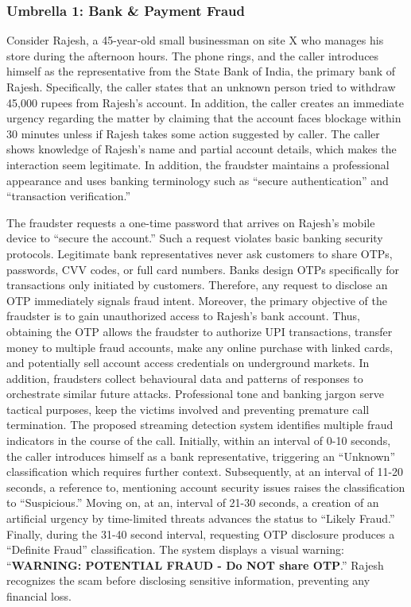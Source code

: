 \documentclass{article}
\begin{document}
\subsubsection{Umbrella 1: Bank \& Payment Fraud}
\label{app:casestudy:bank}

Consider Rajesh, a 45-year-old small businessman on site X who manages his store during the afternoon hours. The phone rings, and the caller introduces himself as the representative from the State Bank of India, the primary bank of Rajesh. Specifically, the caller states that an unknown person tried to withdraw 45,000 rupees from Rajesh's account. In addition, the caller creates an immediate urgency regarding the matter by claiming that the account faces blockage within 30 minutes unless if Rajesh takes some action suggested by caller. The caller shows knowledge of Rajesh's name and partial account details, which makes the interaction seem legitimate. In addition, the fraudster maintains a professional appearance and uses banking terminology such as ``secure authentication'' and ``transaction verification.''

The fraudster requests a one-time password that arrives on Rajesh's mobile device to ``secure the account.'' Such a request violates basic banking security protocols. Legitimate bank representatives never ask customers to share OTPs, passwords, CVV codes, or full card numbers. Banks design OTPs specifically for transactions only initiated by customers. Therefore, any request to disclose an OTP immediately signals fraud intent. Moreover, the primary objective of the fraudster is to gain unauthorized access to Rajesh's bank account. Thus, obtaining the OTP allows the fraudster to authorize UPI transactions, transfer money to multiple fraud accounts, make any online purchase with linked cards, and potentially sell account access credentials on underground markets. In addition, fraudsters collect behavioural data and patterns of responses to orchestrate similar future attacks. Professional tone and banking jargon serve tactical purposes, keep the victims involved and preventing premature call termination. The proposed streaming detection system identifies multiple fraud indicators in the course of the call. Initially, within an interval of 0-10 seconds, the caller introduces himself as a bank representative, triggering an ``Unknown'' classification which requires further context. Subsequently, at an interval of 11-20 seconds, a reference to, mentioning account security issues raises the classification to ``Suspicious.'' Moving on, at an, interval of 21-30 seconds, a creation of an artificial urgency by time-limited threats advances the status to ``Likely Fraud.'' Finally, during the 31-40 second interval, requesting OTP disclosure produces a ``Definite Fraud'' classification. The system displays a visual warning: ``\textbf{WARNING: POTENTIAL FRAUD - Do NOT share OTP}.'' Rajesh recognizes the scam before disclosing sensitive information, preventing any financial loss.
\end{document}
